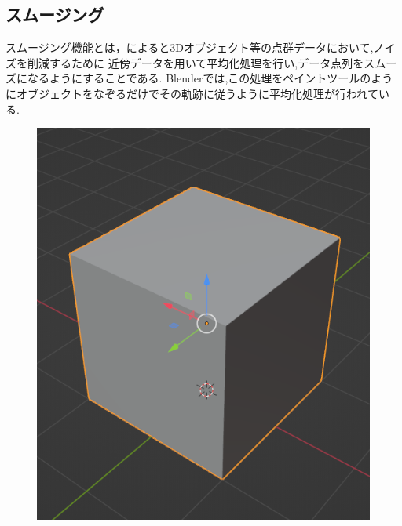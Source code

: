 \documentclass{ltjsreport}
\begin{document}
		\subsection{スムージング}
			スムージング機能とは，\cite{ref:7}によると3Dオブジェクト等の点群データにおいて,ノイズを削減するために
			近傍データを用いて平均化処理を行い,データ点列をスムーズになるようにすることである.
			Blenderでは,この処理をペイントツールのようにオブジェクトをなぞるだけでその軌跡に従うように平均化処理が行われている.
			\begin{figure}[H]
			\centering
			\begin{minipage}{0.3\columnwidth}
			\centering
			\includegraphics[width = \columnwidth]{../figs/SmoothingBeforCube.png}
			\end{minipage}
			\hspace{0.04\columnwidth}
			\begin{minipage}{0.3\columnwidth}
			\centering

\end{minipage}
\end{figure}
\end{document}
